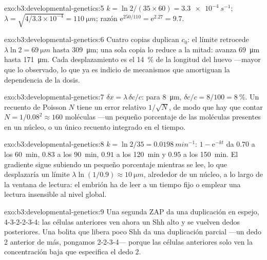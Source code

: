 \begin{solution}{exo:b3:developmental-genetics:5}
$k = \ln 2/(35\times 60) = \qty{3.3e-4}{s^{-1}}$; $\lambda = \sqrt{4/
3.3\times 10^{-4}} = \qty{110}{\micro m}$; razón $\mathrm{e}^{250/110}
= \mathrm{e}^{2.27} = 9.7$.
\end{solution}

\begin{solution}{exo:b3:developmental-genetics:6}
Cuatro copias duplican $c_{0}$: el límite retrocede $\lambda\ln 2 =
\qty{69}{\micro m}$ hasta \qty{309}{\micro m}; una sola copia lo reduce
a la mitad: avanza \qty{69}{\micro m} hasta \qty{171}{\micro m}. Cada
desplazamiento es el \qty{14}{\%} de la longitud del huevo ---mayor que
lo observado, lo que ya es indicio de mecanismos que amortiguan la
dependencia de la dosis.
\end{solution}

\begin{solution}{exo:b3:developmental-genetics:7}
$\delta x = \lambda\,\delta c/c$: para \qty{8}{\micro m}, $\delta c/c =
8/100 = \qty{8}{\%}$. Un recuento de Poisson $N$ tiene un error
relativo $1/\sqrt{N}$, de modo que hay que contar
$N = 1/0.08^{2} \approx 160$ moléculas ---un pequeño porcentaje de las
moléculas presentes en un núcleo, o un único recuento integrado en el
tiempo.
\end{solution}

\begin{solution}{exo:b3:developmental-genetics:8}
$k = \ln 2/35 = \qty{0.0198}{min^{-1}}$: $1 - \mathrm{e}^{-kt}$ da
$0.70$ a los \qty{60}{min}, $0.83$ a los \qty{90}{min}, $0.91$ a los
\qty{120}{min} y $0.95$ a los \qty{150}{min}. El gradiente sigue
subiendo un pequeño porcentaje mientras se lee, lo que desplazaría un
límite $\lambda\ln(1/0.9) \approx \qty{10}{\micro m}$, alrededor de un
núcleo, a lo largo de la ventana de lectura: el embrión ha de leer a un
tiempo fijo o emplear una lectura insensible al nivel global.
\end{solution}

\begin{solution}{exo:b3:developmental-genetics:9}
Una segunda ZAP da una duplicación en espejo, 4-3-2-2-3-4: las células
anteriores ven ahora un Shh alto y se vuelven dedos posteriores. Una
bolita que libera poco Shh da una duplicación parcial ---un dedo 2
anterior de más, pongamos 2-2-3-4--- porque las células anteriores solo
ven la concentración baja que especifica el dedo 2.
\end{solution}

